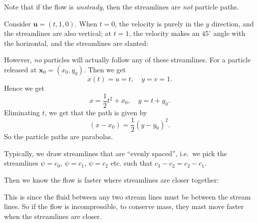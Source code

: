 \documentclass[a4paper]{article}
\begin{document}
Note that if the flow is \emph{unsteady}, then the streamlines are \emph{not} particle paths.
\begin{eg}
  Consider $\mathbf{u} = (t, 1, 0)$. When $t = 0$, the velocity is purely in the $y$ direction, and the streamlines are also vertical; at $t = 1$, the velocity makes an $45^\circ$ angle with the horizontal, and the streamlines are slanted:
  \begin{center}
  \end{center}
  However, \emph{no} particles will actually follow any of these streamlines. For a particle released at $\mathbf{x}_0 = (x_0, y_0)$. Then we get
  \[
    \dot{x}(t) = u = t,\quad \dot{y} = v = 1.
  \]
  Hence we get
  \[
    x = \frac{1}{2}t^2 + x_0,\quad y = t + y_0.
  \]
  Eliminating $t$, we get that the path is given by
  \[
    (x - x_0) = \frac{1}{2}(y - y_0)^2.
  \]
  So the particle paths are parabolas.
\end{eg}
Typically, we draw streamlines that are ``evenly spaced'', i.e.\ we pick the streamlines $\psi = c_0$, $\psi = c_1$, $\psi = c_2$ etc. such that $c_3 - c_2 = c_2 - c_1$.

Then we know the flow is faster where streamlines are closer together:
\begin{center}
\end{center}
This is since the fluid between any two stream lines must be between the stream lines. So if the flow is incompressible, to conserve mass, they mast move faster when the streamlines are closer.
\end{document}
